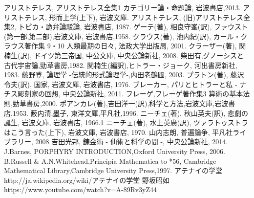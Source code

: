 \begin{thebibliography}{99}
アリストテレス, アリストテレス全集1 カテゴリー論・命題論, 岩波書店,2013.
アリストテレス, 形而上学(上下), 岩波文庫.
アリストテレス, (旧)アリストテレス全集2, トピカ・詭弁論駁論, 岩波書店, 1987.
ゲーテ(著), 相良守峯(訳), ファウスト(第一部,第二部),岩波文庫, 岩波書店,1958.
クラウス(著), 池内紀(訳), 
カール・クラウス著作集 9・10 人類最期の日々, 法政大学出版局, 2001.
クラーザー(著), 関楠生(訳), ドイツ第三帝国, 中公文庫, 中央公論新社, 2008.
柴田有,グノーシスと古代宇宙論,勁草書房,1982.
関楠生(編訳),ヒトラー・ジョーク, 河出書房新社, 1983.
藤野登, 論理学 -伝統的形式論理学-,内田老鶴圃, 2003.
プラトン(著), 藤沢 令夫(訳), 国家, 岩波文庫, 岩波書店, 1976.
ブレーカー, パリとヒトラーと私 - ナチス彫刻家の回想, 中央公論新社, 2011.
フレーゲ,フレーゲ著作集3 算術の基本法則,勁草書房,2000.
ポアンカレ(著),吉田洋一(訳),科学と方法,岩波文庫,岩波書店,1953. 
薮内清,墨子, 東洋文庫,平凡社,1996.
ニーチェ(著), 秋山英夫(訳), 悲劇の誕生, 岩波文庫, 岩波書店, 1966.1
ニーチェ(著), 水上英廣(訳), ツァラトゥストラはこう言った(上下), 
岩波文庫, 岩波書店, 1970.
山内志朗, 普遍論争, 平凡社ライブラリー, 2008
吉田光邦, 錬金術 - 仙術と科学の間 -, 中央公論新社, 2014.
J.Barnes, PORPHYRY INTRODUCTION,Oxford University Press, 2006.
B.Russell \& A.N.Whitehead,Principia Mathematica to *56,
Cambridge Mathematical Library,Cambridge University Press,1997.
アテナイの学堂 
http://ja.wikipedia.org/wiki/アテナイの学堂
野坂昭如
https://www.youtube.com/watch?v=A-89Rv3yZ44
\end{thebibliography}





